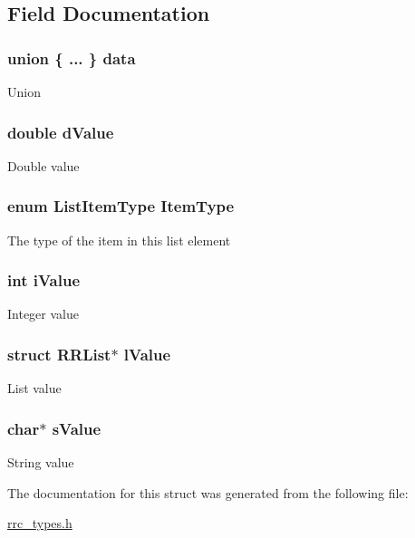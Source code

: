 \subsection{Field Documentation}
\hypertarget{struct_r_r_list_item_ac5bcd1de26b6efabd485bce48ecf8a8a}{
\subsubsection[{data}]{\setlength{\rightskip}{0pt plus 5cm}union \{ ... \}   data}}\label{struct_r_r_list_item_ac5bcd1de26b6efabd485bce48ecf8a8a}
Union \hypertarget{struct_r_r_list_item_ada9c8889b93084880c4bed9c9feeaa42}{
\subsubsection[{d\+Value}]{\setlength{\rightskip}{0pt plus 5cm}double d\+Value}}\label{struct_r_r_list_item_ada9c8889b93084880c4bed9c9feeaa42}
Double value \hypertarget{struct_r_r_list_item_a25c3073c0827a19b3ec0a0ea6d2ad5df}{
\subsubsection[{Item\+Type}]{\setlength{\rightskip}{0pt plus 5cm}enum {\bf List\+Item\+Type} Item\+Type}}\label{struct_r_r_list_item_a25c3073c0827a19b3ec0a0ea6d2ad5df}
The type of the item in this list element \hypertarget{struct_r_r_list_item_ac5de02e20d85842177a764866cef4ad2}{
\subsubsection[{i\+Value}]{\setlength{\rightskip}{0pt plus 5cm}int i\+Value}}\label{struct_r_r_list_item_ac5de02e20d85842177a764866cef4ad2}
Integer value \hypertarget{struct_r_r_list_item_afa0e0bc7c68d478c6819e82bedb5525f}{
\subsubsection[{l\+Value}]{\setlength{\rightskip}{0pt plus 5cm}struct {\bf R\+R\+List}$\ast$ l\+Value}}\label{struct_r_r_list_item_afa0e0bc7c68d478c6819e82bedb5525f}
List value \hypertarget{struct_r_r_list_item_a80e5abe988376805a91503e24e8d1efd}{
\subsubsection[{s\+Value}]{\setlength{\rightskip}{0pt plus 5cm}char$\ast$ s\+Value}}\label{struct_r_r_list_item_a80e5abe988376805a91503e24e8d1efd}
String value 

The documentation for this struct was generated from the following file\+:\begin{DoxyCompactItemize}
\item 
\hyperlink{rrc__types_8h}{rrc\+\_\+types.\+h}\end{DoxyCompactItemize}
